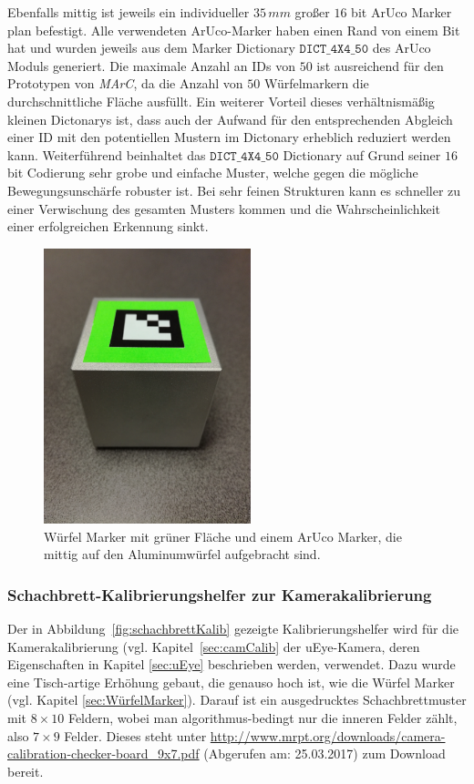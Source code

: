 Ebenfalls mittig ist jeweils ein individueller $35\,mm$ großer $16$ bit ArUco Marker plan befestigt. Alle verwendeten ArUco-Marker haben einen Rand von einem Bit hat und wurden jeweils aus dem Marker Dictionary $\texttt{DICT\_4X4\_50}$ des ArUco Moduls \cite{website:ArucoDoc} generiert. Die maximale Anzahl an IDs von $50$ ist ausreichend für den Prototypen von \textit{MArC}, da die Anzahl von $50$ Würfelmarkern die durchschnittliche Fläche ausfüllt. Ein weiterer Vorteil dieses verhältnismäßig kleinen Dictonarys ist, dass auch der Aufwand für den entsprechenden Abgleich einer ID mit den potentiellen Mustern im Dictonary erheblich reduziert werden kann. 
Weiterführend beinhaltet das $\texttt{DICT\_4X4\_50}$ Dictionary auf Grund seiner $16$ bit Codierung sehr grobe und einfache Muster, welche gegen die mögliche Bewegungsunschärfe robuster ist. Bei sehr feinen Strukturen kann es schneller zu einer Verwischung des gesamten Musters kommen und die Wahrscheinlichkeit einer erfolgreichen Erkennung sinkt.
	\begin{figure}[H] 
	\center 
	\includegraphics[trim = 0mm 280mm 0mm 150mm, clip, width=6cm]{Bilder/tracking-marker.jpg}			
	\caption{Würfel Marker mit grüner Fläche und einem ArUco Marker, die mittig auf den Aluminumwürfel aufgebracht sind.}
	\label{fig:marker}
\end{figure}

\subsubsection{Schachbrett-Kalibrierungshelfer zur Kamerakalibrierung} \label{sec:SchachbrettKalib} 
Der in Abbildung~\ref{fig:schachbrettKalib} gezeigte Kalibrierungshelfer wird für die Kamerakalibrierung (vgl. Kapitel~\ref{sec:camCalib} der uEye-Kamera, deren Eigenschaften in Kapitel \ref{sec:uEye} beschrieben werden, verwendet. Dazu wurde eine Tisch-artige Erhöhung gebaut, die genauso hoch ist, wie die Würfel Marker (vgl. Kapitel \ref{sec:WürfelMarker}). Darauf ist ein ausgedrucktes Schachbrettmuster mit $8\times10$ Feldern, wobei man algorithmus-bedingt nur die inneren Felder zählt, also $7\times9$ Felder. Dieses steht unter \url{http://www.mrpt.org/downloads/camera-calibration-checker-board_9x7.pdf} (Abgerufen am: 25.03.2017) zum Download bereit.


